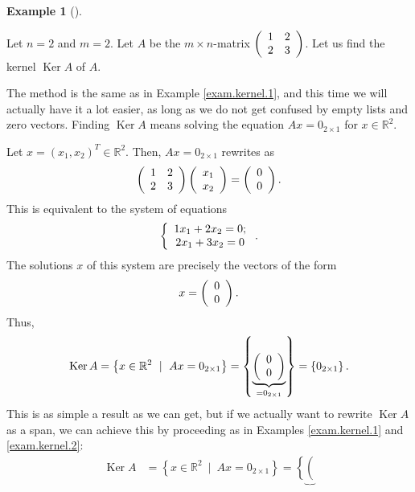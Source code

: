 \documentclass[numbers=enddot,12pt,final,onecolumn,notitlepage]{scrartcl}%
\theoremstyle{definition}
\newtheorem{exam}[theo]{Example}
\newenvironment{example}[1][]
{\begin{exam}[#1]\begin{leftbar}}
{\end{leftbar}\end{exam}}
\begin{document}
\begin{example}
\label{exam.kernel.3}Let $n=2$ and $m=2$. Let $A$ be the $m\times n$-matrix
$\left(
\begin{array}
[c]{cc}%
1 & 2\\
2 & 3
\end{array}
\right)  $. Let us find the kernel $\operatorname*{Ker}A$ of $A$.

The method is the same as in Example \ref{exam.kernel.1}, and this time we
will actually have it a lot easier, as long as we do not get confused by empty
lists and zero vectors. Finding $\operatorname*{Ker}A$ means solving the
equation $Ax=0_{2\times1}$ for $x\in\mathbb{R}^{2}$.

Let $x=\left(  x_{1},x_{2}\right)  ^{T}\in\mathbb{R}^{2}$. Then,
$Ax=0_{2\times1}$ rewrites as%
\[
\left(
\begin{array}
[c]{cc}%
1 & 2\\
2 & 3
\end{array}
\right)  \left(
\begin{array}
[c]{c}%
x_{1}\\
x_{2}%
\end{array}
\right)  =\left(
\begin{array}
[c]{c}%
0\\
0
\end{array}
\right)  .
\]
This is equivalent to the system of equations%
\[
\left\{
\begin{array}
[c]{c}%
1x_{1}+2x_{2}=0;\\
2x_{1}+3x_{2}=0
\end{array}
\right.  .
\]
The solutions $x$ of this system are precisely the vectors of the form%
\[
x=\left(
\begin{array}
[c]{c}%
0\\
0
\end{array}
\right)  .
\]
Thus,%
\[
\operatorname*{Ker}A=\left\{  x\in\mathbb{R}^{2}\ \mid\ Ax=0_{2\times
1}\right\}  =\left\{  \underbrace{\left(
\begin{array}
[c]{c}%
0\\
0
\end{array}
\right)  }_{=0_{2\times1}}\right\}  =\left\{  0_{2\times1}\right\}  .
\]
This is as simple a result as we can get, but if we actually want to rewrite
$\operatorname*{Ker}A$ as a span, we can achieve this by proceeding as in
Examples \ref{exam.kernel.1} and \ref{exam.kernel.2}:%
\begin{align*}
\operatorname*{Ker}A  &  =\left\{  x\in\mathbb{R}^{2}\ \mid\ Ax=0_{2\times
1}\right\}  =\left\{  \underbrace{\left(
}
\end{align*}
\end{example}
\end{document}
